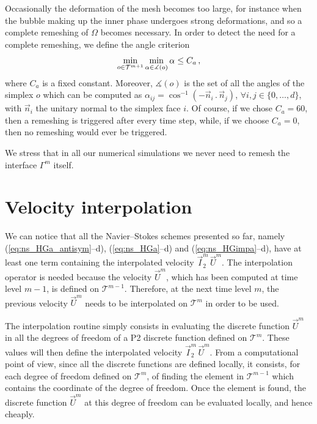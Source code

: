 \documentclass[a4paper,12pt,onecolumn]{article}
\newcommand{\sigmaO}{o}
\begin{document}
Occasionally the deformation of the mesh becomes too large, for instance when
the bubble making up the inner phase undergoes strong deformations, and so a
complete remeshing of $\Omega$ becomes necessary. In order to detect the need
for a complete remeshing, we define the angle criterion
\begin{equation}\label{eq:angle_criterion}
\min_{\sigmaO\in {\cal T}^{m+1}}\min_{\alpha\in \measuredangle(\sigmaO)}\alpha
\leq C_a\,,
\end{equation}
where $C_a$ is a fixed constant. Moreover, $\measuredangle(\sigmaO)$ is the set
of all the angles of the simplex $\sigmaO$ which can be computed as
$\alpha_{ij}=\cos^{-1}(-\vec n_i\,.\,\vec n_j)$, $\forall i,j\in\{0,\dots,d\}$,
with $\vec n_i$ the unitary normal to the simplex face $i$. Of course, if we
chose $C_a=60$\textdegree, then a remeshing is triggered after every time step,
while, if we choose $C_a = 0$\textdegree, then no remeshing would ever be
triggered.

We stress that in all our numerical simulations we never need to remesh the
interface $\Gamma^m$ itself.

\section{Velocity interpolation}\label{sec:velocity_interpolation}
We can notice that all the Navier--Stokes schemes presented so far, namely
(\ref{eq:ns_HGa_antisym}--d), (\ref{eq:ns_HGa}--d) and
(\ref{eq:ns_HGimpa}--d), have at least one term containing the
interpolated velocity $\vec I^m_2\,\vec U^m$. The interpolation operator is
needed because the velocity $\vec U^m$, which has been computed at time level
$m-1$, is defined on $\mathcal{T}^{m-1}$. Therefore, at the next time level
$m$, the previous velocity $\vec U^m$ needs to be interpolated on
$\mathcal{T}^m$ in order to be used.

The interpolation routine simply consists in evaluating the discrete function
$\vec U^m$ in all the degrees of freedom of a P2 discrete function defined on
$\mathcal{T}^m$. These values will then define the interpolated velocity
$\vec I^m_2\,\vec U^m$. From a computational point of view, since all the
discrete functions are defined locally, it consists, for each degree of
freedom defined on $\mathcal{T}^m$, of finding the element in
$\mathcal{T}^{m-1}$ which contains the coordinate of the degree of freedom.
Once the element is found, the discrete function $\vec U^m$ at this degree of
freedom can be evaluated locally, and hence cheaply.
\end{document}
